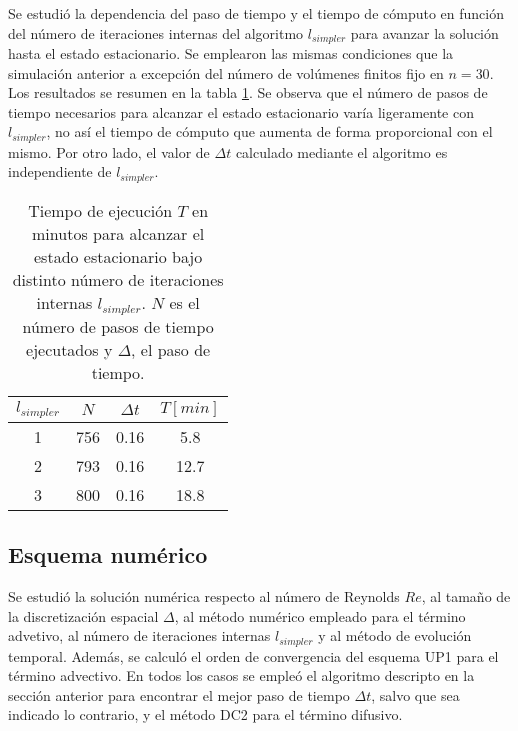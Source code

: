 \documentclass[aps,prb,twocolumn,superscriptaddress,floatfix,longbibliography,10pt]{revtex4-2}
\newcounter{para}
\begin{document}
Se estudió la dependencia del paso de tiempo y el tiempo de cómputo en función del número de iteraciones internas del algoritmo $l_{simpler}$ para avanzar la solución hasta el estado estacionario. Se emplearon las mismas condiciones que la simulación anterior a excepción del número de volúmenes finitos fijo en $n = 30$. Los resultados se resumen en la tabla \ref{tabla:dt_costo_vs_lsimpler}. Se observa que el número de pasos de tiempo necesarios para alcanzar el estado estacionario varía ligeramente con $l_{simpler}$, no así el tiempo de cómputo que aumenta de forma proporcional con el mismo. Por otro lado, el valor de $\Delta t$ calculado mediante el algoritmo es independiente de $l_{simpler}$.





\begin{table}[]
  \begin{tabular}{|c|c|c|c|}
  \hline
  \multicolumn{1}{|c|}{$l_{simpler}$ \quad} & \multicolumn{1}{c|}{$N$\quad} & \multicolumn{1}{c|}{$\Delta t$\quad} & \multicolumn{1}{c|}{$T [min]$} \\ \hline
  1 & 756 & 0.16 & 5.8 \\ \hline
  2 & 793 & 0.16 & 12.7 \\ \hline
  3 & 800 & 0.16 & 18.8 \\ \hline
  \end{tabular}
  \caption{Tiempo de ejecución $T$ en minutos para alcanzar el estado estacionario bajo distinto número de iteraciones internas $l_{simpler}$. $N$ es el número de pasos de tiempo ejecutados y $\Delta$, el paso de tiempo.}
  \label{tabla:dt_costo_vs_lsimpler}
\end{table}


\subsection{Esquema numérico}

Se estudió la solución numérica respecto al número de Reynolds $Re$, al tamaño de la discretización espacial $\Delta$, al método numérico empleado para el término advetivo, al número de iteraciones internas $l_{simpler}$ y al método de evolución temporal. Además, se calculó el orden de convergencia del esquema UP1 para el término advectivo. En todos los casos se empleó el algoritmo descripto en la sección anterior para encontrar el mejor paso de tiempo $\Delta t$, salvo que sea indicado lo contrario, y el método DC2 para el término difusivo.
\end{document}
